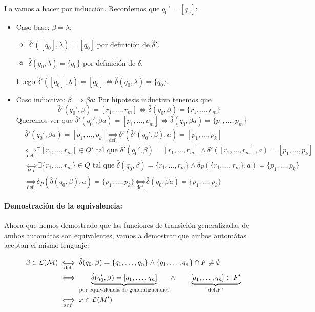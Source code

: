 Lo vamos a hacer por inducción. Recordemos que \(q_0' = [q_0]\):
\begin{itemize}
  \item Caso base: \(\beta = \lambda\):
        \begin{itemize}
          \item \(\hat{\delta}'([q_0],\lambda) = [q_0]\) por definición de \(\hat{\delta}'\).
          \item \(\hat{\delta}(q_0,\lambda) = \{q_0\}\) por definición de \(\hat{\delta}\).
        \end{itemize}
        Luego \(\hat{\delta}'([q_0],\lambda) = [q_0] \iff \hat{\delta}(q_0,\lambda) = \{q_0\}\).

  \item Caso inductivo: \(\beta \implies \beta a\): Por hipotesis inductiva tenemos que \[\hat{\delta}'(q_0',\beta) = [r_1,\dots,r_m] \iff \hat{\delta}(q_0,\beta) = \{r_1,\dots, r_m\}\]
        Queremos ver que \(\hat{\delta}'(q_0',\beta a) = [p_1,\dots,p_m] \iff \hat{\delta}(q_0,\beta a) = \{p_1,\dots, p_m\}\)
        \begin{align*}
           & \hat{\delta}'(q_0',\beta a) = [p_1,\dots,p_k]  \underset{\text{def.}}{\iff} \delta'(\hat{\delta}'(q_0',\beta),a) = [p_1,\dots,p_k]                                           \\
           & \underset{\text{def.}}{\iff} \exists [r_1,\dots,r_m]\in Q' \text{ tal que } \delta'(q_0',\beta) = [r_1,\dots,r_m] \land \delta'([r_1,\dots,r_m],a) = [p_1,\dots,p_k]         \\
           & \underset{H.I.}{\iff} \exists \{   r_1,\dots,r_m\}\in Q \text{ tal que } \hat{\delta}(q_0,\beta) = \{r_1,\dots,r_m\} \land \delta_P(\{r_1,\dots,r_m\},a) = \{p_1,\dots,p_k\} \\
           & \underset{\text{def.}}{\iff} \delta_P(\hat{\delta}(q_0,\beta),a) = \{p_1,\dots,p_k\} \underset{\text{def.}}{\iff} \hat{\delta}(q_0,\beta a) = \{p_1,\dots,p_k\}
        \end{align*}
\end{itemize}

\paragraph{Demostración de la equivalencia:} Ahora que hemos demostrado que las funciones de transición generalizadas de ambos automátas son equivalentes, vamos a demostrar que ambos automátas aceptan el mismo lenguaje:

\begin{align*}
  \beta \in \mathcal{L}(\mathcal{M}) & \underset{\text{def.}}{\iff} \hat\delta(q_0, \beta) = \{q_1,\dots, q_n\}\land\{q_1,\dots,q_n\}\cap F \neq \emptyset                                                                              \\
                                     & \iff \underbrace{\hat\delta(q_0', \beta) = [q_1,\dots, q_n]}_{\text{\scriptsize por equivalencia de generalizaciones}} \land~~~~~~\underbrace{[q_1,\dots,q_n]\in F'}_{\text{\scriptsize def.}F'} \\
                                     & \underset{def.}{\iff} x\in\mathcal{L}(M')
\end{align*}

